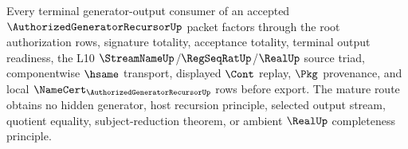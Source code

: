 \begin{theorem}
\label{thm:authorized-generator-recursor-mature-route-exhaustion}
Every terminal generator-output consumer of an accepted $\AuthorizedGeneratorRecursorUp$ packet factors through the root authorization rows, signature totality, acceptance totality, terminal output readiness, the L10 $\StreamNameUp$/$\RegSeqRatUp$/$\RealUp$ source triad, componentwise $\hsame$ transport, displayed $\Cont$ replay, $\Pkg$ provenance, and local $\NameCert_{\AuthorizedGeneratorRecursorUp}$ rows before export. The mature route obtains no hidden generator, host recursion principle, selected output stream, quotient equality, subject-reduction theorem, or ambient $\RealUp$ completeness principle.
\end{theorem}
